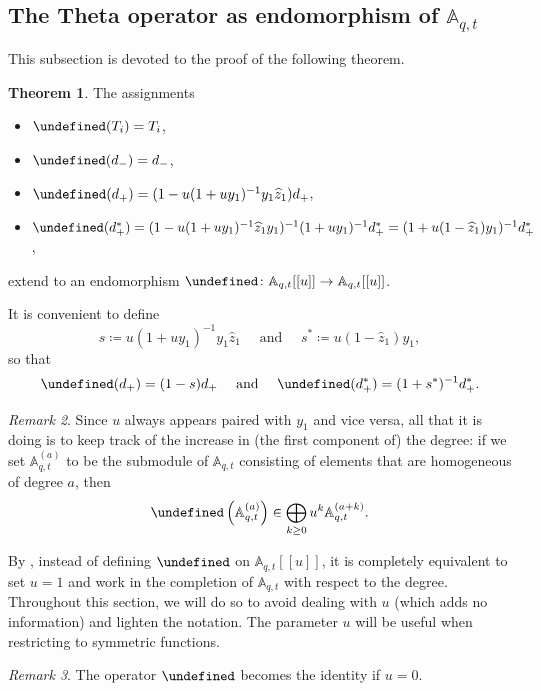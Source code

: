 \documentclass[reqno]{amsart}
\theoremstyle{plain}
\theoremstyle{definition}
\newtheorem{theorem}{Theorem}[section]
\theoremstyle{remark}
\newtheorem{remark}[theorem]{Remark}
\newcommand{\A}{\mathbb{A}}%
\newcommand{\z}{\widehat{z}}
\let\oldTheta\Theta
\let\Theta\undefined
\DeclareMathOperator{\Theta}{\oldTheta}
\newcommand{\<}{\langle}
\renewcommand{\>}{\rangle}
\begin{document}
\subsection{The Theta operator as endomorphism of \texorpdfstring{$\A_{q,t}$}{Aqt}}

This subsection is devoted to the proof of the following theorem.

\begin{theorem}
    \label{thm:Theta_def}
    The assignments
    \begin{itemize}
        \item $\Theta(T_i) = T_i$,
        \item $\Theta(d_-) = d_-$,
        \item $\Theta(d_+) = (1 - u (1 + u y_1)^{-1} y_1 \z_1) d_+$,
        \item $\Theta(d_+^*) = (1 - u (1 + u y_1)^{-1} \z_1 y_1)^{-1} (1 + uy_1)^{-1} d_+^*= (1 + u (1 - \z_1) y_1)^{-1} d_+^*$,
    \end{itemize}
    extend to an endomorphism $\Theta \colon \A_{q,t}[[u]] \rightarrow \A_{q,t}[[u]]$.
\end{theorem}

It is convenient to define
\[ s \coloneqq u (1 + u y_1)^{-1} y_1 \z_1 \quad \text{ and } \quad s^* \coloneqq u (1 - \z_1) y_1, \] so that
\[ \Theta(d_+) = (1-s) d_+ \quad \text{ and } \quad \Theta(d_+^*) = (1+s^*)^{-1} d_+^*. \]

\begin{remark}
    \label{rmk:u}
    Since $u$ always appears paired with $y_1$ and vice versa, all that it is doing is to keep track of the increase in (the first component of) the degree: if we set $\A_{q,t}^{(a)}$ to be the submodule of $\A_{q,t}$ consisting of elements that are homogeneous of degree $a$, then
    \[ \Theta \left( \A_{q,t}^{(a)} \right) \in \bigoplus_{k \geq 0} u^k \A_{q,t}^{(a+k)}. \]
\end{remark}

By , instead of defining $\Theta$ on $\A_{q,t}[[u]]$, it is completely equivalent to set $u=1$ and work in the completion of $\A_{q,t}$ with respect to the degree. Throughout this section, we will do so to avoid dealing with $u$ (which adds no information) and lighten the notation. The parameter $u$ will be useful when restricting to symmetric functions.

\begin{remark}
    The operator $\Theta$ becomes the identity if $u=0$.
\end{remark}
\end{document}
